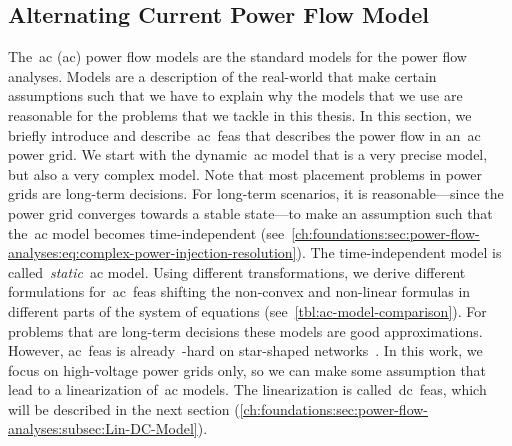 \subsection{Alternating Current Power Flow Model}
\label{ch:foundations:sec:power-flow-analyses:subsec:AC-Model}
% 
The~\acrlong{ac} (\gls{ac}) power flow models are the standard models for the
power flow analyses. Models are a description of the real-world that make
certain assumptions such that we have to explain why the models that we use are
reasonable for the problems that we tackle in this thesis. In this section, we
briefly introduce and describe~\gls{ac}~\gls{feas} that describes the power flow
in an~\gls{ac} power grid. We start with the dynamic~\gls{ac} model that is a
very precise model, but also a very complex model. Note that most placement
problems in power grids are long-term decisions. For long-term scenarios, it is
reasonable---since the power grid converges towards a stable state---to make an
assumption such that the~\gls{ac} model becomes time-independent
(see~\cref{ch:foundations:sec:power-flow-analyses:eq:complex-power-injection-resolution}).
The time-independent model is called~\emph{static}~\gls{ac} model. Using
different transformations, we derive different formulations
for~\gls{ac}~\gls{feas} shifting the non-convex and non-linear formulas in
different parts of the system of equations (see~\cref{tbl:ac-model-comparison}).
For problems that are long-term decisions these models are good approximations.
However, \gls{ac}~\gls{feas} is already~\NP-hard on star-shaped
networks~\parencite{Leh16}. In this work, we focus on high-voltage power grids
only, so we can make some assumption that lead to a linearization of~\gls{ac}
models. The linearization is called~\gls{dc}~\gls{feas}, which will be described
in the next section 
(\cref{ch:foundations:sec:power-flow-analyses:subsec:Lin-DC-Model}).

